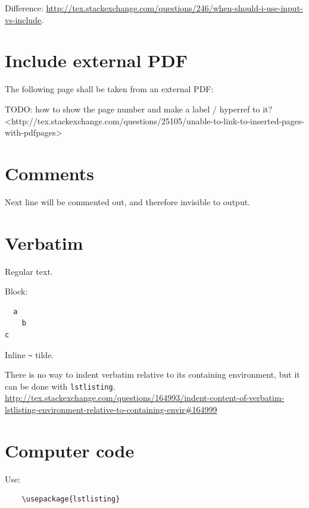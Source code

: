\documentclass[12pt]{article}
\begin{document}
  Difference: \url{http://tex.stackexchange.com/questions/246/when-should-i-use-input-vs-include}.

\section{Include external PDF}\label{include-external-pdf}

  The following page shall be taken from an external PDF:

  

  TODO: how to show the page number and make a label / hyperref to it? <http://tex.stackexchange.com/questions/25105/unable-to-link-to-inserted-pages-with-pdfpages>

\section{Comments}\label{comments}

    Next line will be commented out, and therefore invisible to output.

\section{Verbatim}\label{verbatim}

  Regular text.

  Block:

  \begin{verbatim}
  a
    b
c
  \end{verbatim}

  Inline \verb|~| tilde.

  There is no way to indent verbatim relative to its containing environment, but it can be done with \lstinline|lstlisting|.
  \url{http://tex.stackexchange.com/questions/164993/indent-content-of-verbatim-lstlisting-environment-relative-to-containing-envir#164999}

\section{Computer code}\label{computer-code}

  Use:

  \begin{lstlisting}
    \usepackage{lstlisting}
  \end{lstlisting}
\end{document}
